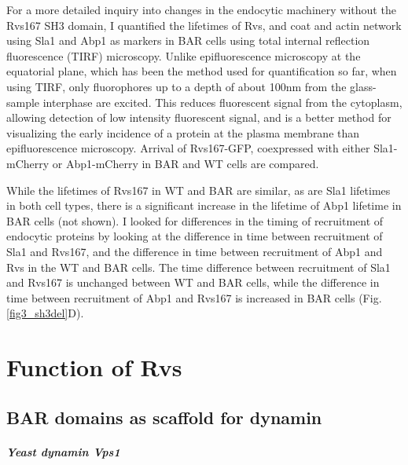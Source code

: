 For a more detailed inquiry into changes in the endocytic machinery without the Rvs167 SH3 domain, I quantified the lifetimes of Rvs, and coat and actin network using Sla1 and Abp1 as markers in BAR cells using total internal reflection fluorescence (TIRF) microscopy. Unlike epifluorescence microscopy at the equatorial plane, which has been the method used for quantification so far, when using TIRF, only fluorophores up to a depth of about 100nm from the glass-sample interphase are excited. This reduces fluorescent signal from the cytoplasm, allowing detection of low intensity fluorescent signal, and is a better method for visualizing the early incidence of a protein at the plasma membrane than epifluorescence microscopy. Arrival of Rvs167-GFP, coexpressed with either Sla1-mCherry or Abp1-mCherry in BAR and WT cells are compared. 

	
	\vspace{5mm}
While the lifetimes of Rvs167 in WT and BAR are similar, as are Sla1 lifetimes in both cell types, there is a significant increase in the lifetime of Abp1 lifetime in BAR cells (not shown). I looked for differences in the timing of recruitment of endocytic proteins by looking at the difference in time between recruitment of Sla1 and Rvs167, and the difference in time between recruitment of Abp1 and Rvs in the WT and BAR cells. The time difference between recruitment of Sla1 and Rvs167 is unchanged between WT and BAR cells, while the difference in time between recruitment of Abp1 and Rvs167 is increased in BAR cells (Fig.\ref{fig3_sh3del}D).


		
\section{Function of Rvs}

	\subsection{BAR domains as scaffold for dynamin}
	\subparagraph{Yeast dynamin Vps1}
	
